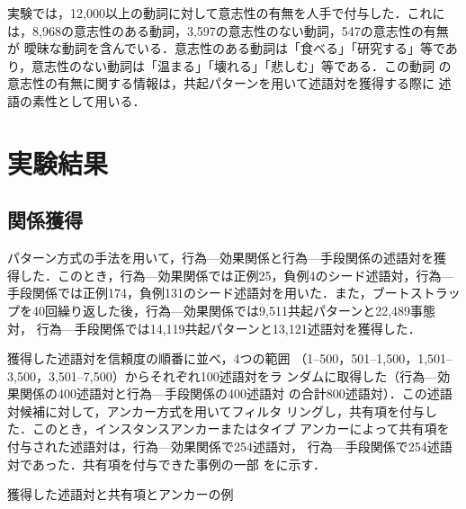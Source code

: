 \documentclass[japanese]{jnlp_1.4}
\begin{document}
実験では，12,000以上の動詞に対して意志性の有無を人手で付与した．これに
は，8,968の意志性のある動詞，3,597の意志性のない動詞，547の意志性の有無が
曖昧な動詞を含んでいる．意志性のある動詞は「食べる」「研究する」等であ
り，意志性のない動詞は「温まる」「壊れる」「悲しむ」等である．この動詞
の意志性の有無に関する情報は，共起パターンを用いて述語対を獲得する際に
述語の素性として用いる．


\section{実験結果}
\label{sec:result}


\subsection{関係獲得}
\label{ssec:result_relation}

パターン方式の手法を用いて，行為—効果関係と行為—手段関係の述語対を獲
得した．このとき，行為—効果関係では正例25，負例4のシード述語対，行為—
手段関係では正例174，負例131のシード述語対を用いた．また，ブートストラッ
プを40回繰り返した後，行為—効果関係では9,511共起パターンと22,489事態対，
行為—手段関係では14,119共起パターンと13,121述語対を獲得した．

獲得した述語対を信頼度の順番に並べ，4つの範囲
（1--500，501--1,500，1,501--3,500，3,501--7,500）からそれぞれ100述語対をラ
ンダムに取得した（行為—効果関係の400述語対と行為—手段関係の400述語対
の合計800述語対）．この述語対候補に対して，アンカー方式を用いてフィルタ
リングし，共有項を付与した．このとき，インスタンスアンカーまたはタイプ
アンカーによって共有項を付与された述語対は，行為—効果関係で254述語対，
行為—手段関係で254述語対であった．共有項を付与できた事例の一部
をに示す．

\begin{table}[b]
\caption{獲得した述語対と共有項とアンカーの例}
\label{tab:examples}

\end{table}
\end{document}
